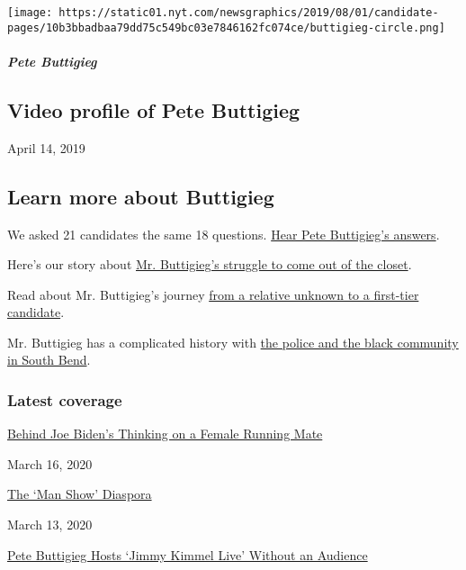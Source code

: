 \texttt{[image: https://static01.nyt.com/newsgraphics/2019/08/01/candidate-pages/10b3bbadbaa79dd75c549bc03e7846162fc074ce/buttigieg-circle.png]}

\hypertarget{pete-buttigieg-1}{%
\subparagraph{Pete Buttigieg}\label{pete-buttigieg-1}}

\hypertarget{video-profile-of-pete-buttigieg}{%
\subsection{Video profile of Pete
Buttigieg}\label{video-profile-of-pete-buttigieg}}

April 14, 2019

\hypertarget{learn-more-about-buttigieg}{%
\subsection{Learn more about
Buttigieg}\label{learn-more-about-buttigieg}}

We asked 21 candidates the same 18 questions.
\href{https://www.nytimes.com/interactive/2019/us/politics/pete-buttigieg-2020-campaign.html}{Hear
Pete Buttigieg's answers}.

Here's our story about
\href{https://www.nytimes.com/2019/07/14/us/politics/pete-buttigieg-gay.html}{Mr.
Buttigieg's struggle to come out of the closet}.

Read about Mr. Buttigieg's journey
\href{https://www.nytimes.com/2019/07/18/magazine/pete-buttigieg-2020.html}{from
a relative unknown to a first-tier candidate}.

Mr. Buttigieg has a complicated history with
\href{https://www.nytimes.com/2019/06/18/us/politics/buttigieg-police-black-community.html}{the
police and the black community in South Bend}.

\hypertarget{latest-coverage}{%
\subsubsection{Latest coverage}\label{latest-coverage}}

\href{https://www.nytimes.com/2020/03/16/us/politics/joe-biden-vp-running-mate.html}{Behind
Joe Biden's Thinking on a Female Running Mate}

March 16, 2020

\href{https://www.nytimes.com/2020/03/13/us/politics/jimmy-kimmel-the-man-show.html}{The
`Man Show' Diaspora}

March 13, 2020

\href{https://www.nytimes.com/2020/03/13/arts/television/late-night-audience-trump-speech.html}{Pete
Buttigieg Hosts `Jimmy Kimmel Live' Without an Audience}

